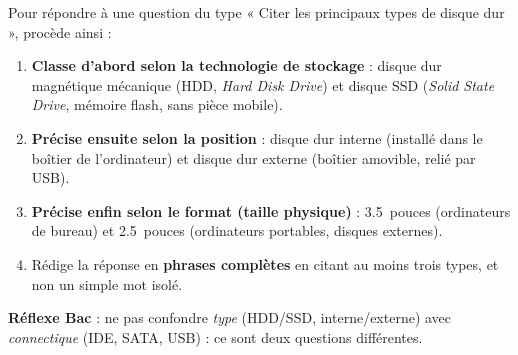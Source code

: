 \documentclass[11pt]{article}
\newcommand{\cle}[1]{{\popxbold\color{popdark}#1}}
\begin{document}
\begin{methode}
Pour répondre à une question du type « Citer les principaux types de disque dur », procède ainsi :
\begin{enumerate}
\item \textbf{Classe d'abord selon la technologie de stockage} : disque dur \cle{magnétique} mécanique (HDD, \emph{Hard Disk Drive}) et disque \cle{SSD} (\emph{Solid State Drive}, mémoire flash, sans pièce mobile).
\item \textbf{Précise ensuite selon la position} : disque dur \cle{interne} (installé dans le boîtier de l'ordinateur) et disque dur \cle{externe} (boîtier amovible, relié par USB).
\item \textbf{Précise enfin selon le format (taille physique)} : \SI{3,5}{pouces} (ordinateurs de bureau) et \SI{2,5}{pouces} (ordinateurs portables, disques externes).
\item Rédige la réponse en \textbf{phrases complètes} en citant au moins trois types, et non un simple mot isolé.
\end{enumerate}
\textbf{Réflexe Bac} : ne pas confondre \emph{type} (HDD/SSD, interne/externe) avec \emph{connectique} (IDE, SATA, USB) : ce sont deux questions différentes.
\end{methode}
\end{document}
